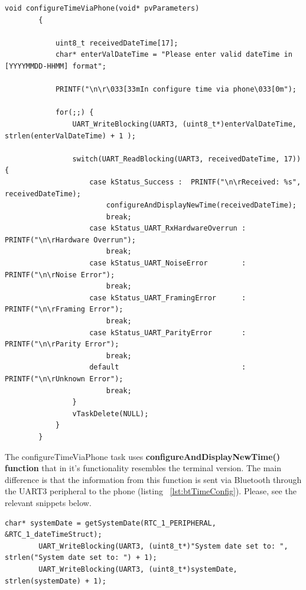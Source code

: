 \documentclass[12pt,a4paper]{article}
\begin{document}
        
        \begin{lstlisting}[label={lst:configureTimeViaPhone}, caption=configureTimeViaPhone() task]
         void configureTimeViaPhone(void* pvParameters)
        {

            uint8_t receivedDateTime[17];
            char* enterValDateTime = "Please enter valid dateTime in [YYYYMMDD-HHMM] format";

            PRINTF("\n\r\033[33mIn configure time via phone\033[0m");

            for(;;) {
                UART_WriteBlocking(UART3, (uint8_t*)enterValDateTime, strlen(enterValDateTime) + 1 );

                switch(UART_ReadBlocking(UART3, receivedDateTime, 17)) {
                    case kStatus_Success : 	PRINTF("\n\rReceived: %s", receivedDateTime);
                        configureAndDisplayNewTime(receivedDateTime);
                        break;
                    case kStatus_UART_RxHardwareOverrun : 	PRINTF("\n\rHardware Overrun"); 
                        break;
                    case kStatus_UART_NoiseError 		: 	PRINTF("\n\rNoise Error"); 
                        break;
                    case kStatus_UART_FramingError 		: 	PRINTF("\n\rFraming Error"); 
                        break;
                    case kStatus_UART_ParityError 		: 	PRINTF("\n\rParity Error"); 
                        break;
                    default								: 	PRINTF("\n\rUnknown Error"); 
                        break;
                }
                vTaskDelete(NULL);
            }
        }
        \end{lstlisting}
        The configureTimeViaPhone task uses {\bfseries configureAndDisplayNewTime() function} that in it's functionality resembles the terminal version. The main difference is that the information from this function is sent via Bluetooth through the UART3 peripheral to the phone (listing ~\ref{lst:btTimeConfig}). Please, see the relevant snippets below. 
        \begin{lstlisting}[label={lst:btTimeConfig}, caption=Time and date BT communication]
        char* systemDate = getSystemDate(RTC_1_PERIPHERAL, &RTC_1_dateTimeStruct);
        UART_WriteBlocking(UART3, (uint8_t*)"System date set to: ", strlen("System date set to: ") + 1);
        UART_WriteBlocking(UART3, (uint8_t*)systemDate, strlen(systemDate) + 1);
        \end{lstlisting}
        
\end{document}
